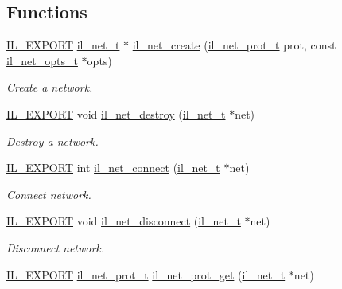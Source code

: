 \subsection*{Functions}
\begin{DoxyCompactItemize}
\item 
\hyperlink{common_8h_a6bb629d26c52bfe10519ba3176853f47}{I\+L\+\_\+\+E\+X\+P\+O\+RT} \hyperlink{group__IL__NET_ga0657204ab779a5b7a504aa0b895d1ae6}{il\+\_\+net\+\_\+t} $\ast$ \hyperlink{group__IL__NET_gaed82d6f49871934f3b6fdf3a9a022cc6}{il\+\_\+net\+\_\+create} (\hyperlink{group__IL__NET_ga9629f7451843e493e7665754b5c2feca}{il\+\_\+net\+\_\+prot\+\_\+t} prot, const \hyperlink{structil__net__opts__t}{il\+\_\+net\+\_\+opts\+\_\+t} $\ast$opts)
\begin{DoxyCompactList}\small\item\em Create a network. \end{DoxyCompactList}\item 
\hyperlink{common_8h_a6bb629d26c52bfe10519ba3176853f47}{I\+L\+\_\+\+E\+X\+P\+O\+RT} void \hyperlink{group__IL__NET_ga4b9335320c644d86491b3bc20e055f5f}{il\+\_\+net\+\_\+destroy} (\hyperlink{group__IL__NET_ga0657204ab779a5b7a504aa0b895d1ae6}{il\+\_\+net\+\_\+t} $\ast$net)
\begin{DoxyCompactList}\small\item\em Destroy a network. \end{DoxyCompactList}\item 
\hyperlink{common_8h_a6bb629d26c52bfe10519ba3176853f47}{I\+L\+\_\+\+E\+X\+P\+O\+RT} int \hyperlink{group__IL__NET_gae7992a1213d501e4df7ef3ae64e0c835}{il\+\_\+net\+\_\+connect} (\hyperlink{group__IL__NET_ga0657204ab779a5b7a504aa0b895d1ae6}{il\+\_\+net\+\_\+t} $\ast$net)
\begin{DoxyCompactList}\small\item\em Connect network. \end{DoxyCompactList}\item 
\hyperlink{common_8h_a6bb629d26c52bfe10519ba3176853f47}{I\+L\+\_\+\+E\+X\+P\+O\+RT} void \hyperlink{group__IL__NET_gaaacc31d9cbf294a17dae29eacfb7e735}{il\+\_\+net\+\_\+disconnect} (\hyperlink{group__IL__NET_ga0657204ab779a5b7a504aa0b895d1ae6}{il\+\_\+net\+\_\+t} $\ast$net)
\begin{DoxyCompactList}\small\item\em Disconnect network. \end{DoxyCompactList}\item 
\hyperlink{common_8h_a6bb629d26c52bfe10519ba3176853f47}{I\+L\+\_\+\+E\+X\+P\+O\+RT} \hyperlink{group__IL__NET_ga9629f7451843e493e7665754b5c2feca}{il\+\_\+net\+\_\+prot\+\_\+t} \hyperlink{group__IL__NET_gaa72feed444ad53acc497505239b950f9}{il\+\_\+net\+\_\+prot\+\_\+get} (\hyperlink{group__IL__NET_ga0657204ab779a5b7a504aa0b895d1ae6}{il\+\_\+net\+\_\+t} $\ast$net)

\end{DoxyCompactItemize}
